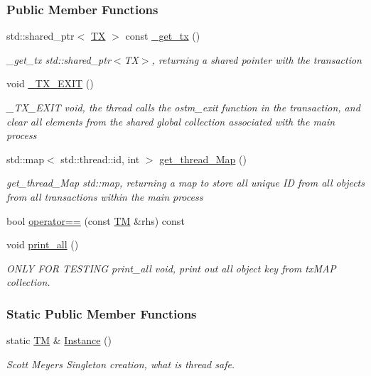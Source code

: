 \subsubsection*{Public Member Functions}
\begin{DoxyCompactItemize}
\item 
std\+::shared\+\_\+ptr$<$ \hyperlink{class_t_x}{TX} $>$ const \hyperlink{class_t_m_a41cb0226cc4080c931651b13f74a0075_a41cb0226cc4080c931651b13f74a0075}{\+\_\+get\+\_\+tx} ()
\begin{DoxyCompactList}\small\item\em \+\_\+get\+\_\+tx std\+::shared\+\_\+ptr$<$\+T\+X$>$, returning a shared pointer with the transaction \end{DoxyCompactList}\item 
void \hyperlink{class_t_m_a5e2d1127f2429f2f524d25f430eade06_a5e2d1127f2429f2f524d25f430eade06}{\+\_\+\+T\+X\+\_\+\+E\+X\+IT} ()
\begin{DoxyCompactList}\small\item\em \+\_\+\+T\+X\+\_\+\+E\+X\+IT void, the thread calls the ostm\+\_\+exit function in the transaction, and clear all elements from the shared global collection associated with the main process \end{DoxyCompactList}\item 
std\+::map$<$ std\+::thread\+::id, int $>$ \hyperlink{class_t_m_afb8bc9f42fe06c52747beb7f4c46915c_afb8bc9f42fe06c52747beb7f4c46915c}{get\+\_\+thread\+\_\+\+Map} ()
\begin{DoxyCompactList}\small\item\em get\+\_\+thread\+\_\+\+Map std\+::map, returning a map to store all unique ID from all objects from all transactions within the main process \end{DoxyCompactList}\item 
bool \hyperlink{class_t_m_a3285005a8f3e9fed99b024dac86fae05_a3285005a8f3e9fed99b024dac86fae05}{operator==} (const \hyperlink{class_t_m}{TM} \&rhs) const 
\item 
void \hyperlink{class_t_m_a1d6891b1d3e71cc0acef54e7afe71c09_a1d6891b1d3e71cc0acef54e7afe71c09}{print\+\_\+all} ()
\begin{DoxyCompactList}\small\item\em O\+N\+LY F\+OR T\+E\+S\+T\+I\+NG print\+\_\+all void, print out all object key from tx\+M\+AP collection. \end{DoxyCompactList}\end{DoxyCompactItemize}
\subsubsection*{Static Public Member Functions}
\begin{DoxyCompactItemize}
\item 
static \hyperlink{class_t_m}{TM} \& \hyperlink{class_t_m_a7ce5f35e0dae76df4fe116cf905bbe60_a7ce5f35e0dae76df4fe116cf905bbe60}{Instance} ()
\begin{DoxyCompactList}\small\item\em Scott Meyer\textquotesingle{}s Singleton creation, what is thread safe. \end{DoxyCompactList}\end{DoxyCompactItemize}

